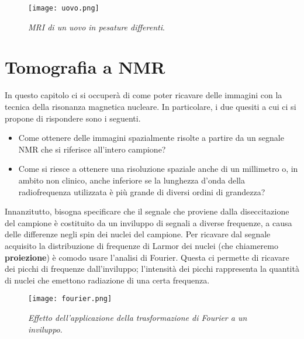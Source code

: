 \documentclass{report}
\numberwithin{equation}{section}
\numberwithin{figure}{section}
\begin{document}
\begin{figure}[htp]
\centering
\texttt{[image: uovo.png]}
\caption{\label{fig:uovo} \textit{MRI di un uovo in pesature differenti}.}
\end{figure}

\section{Tomografia a NMR}
In questo capitolo ci si occuperà di come poter ricavare delle immagini con la tecnica della risonanza magnetica nucleare. In particolare, i due quesiti a cui ci si propone di rispondere sono i seguenti.
\begin{itemize}[label=$-$]
    \item Come ottenere delle immagini spazialmente risolte a partire da un segnale NMR che si riferisce all'intero campione?
    \item Come si riesce a ottenere una risoluzione spaziale anche di un millimetro o, in ambito non clinico, anche inferiore se la lunghezza d'onda della radiofrequenza utilizzata è più grande di diversi ordini di grandezza?
\end{itemize}
Innanzitutto, bisogna specificare che il segnale che proviene dalla diseccitazione del campione è costituito da un inviluppo di segnali a diverse frequenze, a causa delle differenze negli spin dei nuclei del campione. Per ricavare dal segnale acquisito la distribuzione di frequenze di Larmor dei nuclei (che chiameremo \textbf{proiezione}) è comodo usare l'analisi di Fourier. Questa ci permette di ricavare dei picchi di frequenze dall'inviluppo; l'intensità dei picchi rappresenta la quantità di nuclei che emettono radiazione di una certa frequenza.

\begin{figure}[htp]
\centering
\texttt{[image: fourier.png]}
\caption{\label{fig:fourier} \textit{Effetto dell'applicazione della trasformazione di Fourier a un inviluppo}.}
\end{figure}
\end{document}
